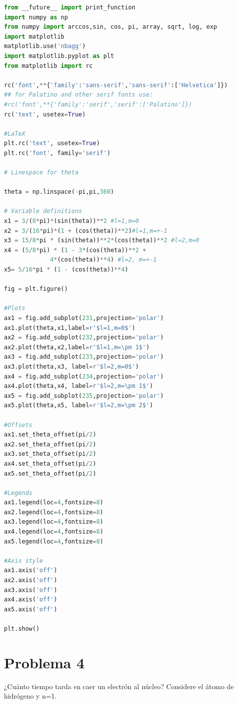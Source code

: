 \documentclass[a4paper,11pt]{article}
\numberwithin{equation}{section}
\begin{document}
\begin{lstlisting}[language=Python]
 from __future__ import print_function
import numpy as np
from numpy import arccos,sin, cos, pi, array, sqrt, log, exp
import matplotlib
matplotlib.use('nbagg')
import matplotlib.pyplot as plt
from matplotlib import rc

rc('font',**{'family':'sans-serif','sans-serif':['Helvetica']})
## for Palatino and other serif fonts use:
#rc('font',**{'family':'serif','serif':['Palatino']})
rc('text', usetex=True)

#LaTeX
plt.rc('text', usetex=True)
plt.rc('font', family='serif')

# Linespace for theta

theta = np.linspace(-pi,pi,360)

# Variable definitions
x1 = 3/(8*pi)*(sin(theta))**2 #l=1,m=0
x2 = 3/(16*pi)*(1 + (cos(theta))**2)#l=1,m=+-1
x3 = 15/8*pi * (sin(theta))**2*(cos(theta))**2 #l=2,m=0
x4 = (5/8*pi) * (1 - 3*(cos(theta))**2 + 
             4*(cos(theta))**4) #l=2, m=+-1
x5= 5/16*pi * (1 - (cos(theta))**4)

fig = plt.figure()

#Plots
ax1 = fig.add_subplot(231,projection='polar')
ax1.plot(theta,x1,label=r'$l=1,m=0$')
ax2 = fig.add_subplot(232,projection='polar')
ax2.plot(theta,x2,label=r'$l=1,m=\pm 1$')
ax3 = fig.add_subplot(233,projection='polar')
ax3.plot(theta,x3, label=r'$l=2,m=0$')
ax4 = fig.add_subplot(234,projection='polar')
ax4.plot(theta,x4, label=r'$l=2,m=\pm 1$')
ax5 = fig.add_subplot(235,projection='polar')
ax5.plot(theta,x5, label=r'$l=2,m=\pm 2$')

#Offsets
ax1.set_theta_offset(pi/2)
ax2.set_theta_offset(pi/2)
ax3.set_theta_offset(pi/2)
ax4.set_theta_offset(pi/2)
ax5.set_theta_offset(pi/2)

#Legends
ax1.legend(loc=4,fontsize=8)
ax2.legend(loc=4,fontsize=8)
ax3.legend(loc=4,fontsize=8)
ax4.legend(loc=4,fontsize=8)
ax5.legend(loc=4,fontsize=8)

#Axis style
ax1.axis('off')
ax2.axis('off')
ax3.axis('off')
ax4.axis('off')
ax5.axis('off')

plt.show()
\end{lstlisting}

\section{Problema 4}

¿Cuánto tiempo tarda en caer un electrón al núcleo? Considere el átomo de hidrógeno 
y n=1.
\end{document}
